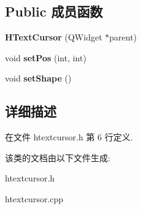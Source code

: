 \subsection*{Public 成员函数}
\begin{DoxyCompactItemize}
\item 
{\bfseries H\+Text\+Cursor} (Q\+Widget $\ast$parent)\label{class_h_text_cursor_a4c210eb0b6ec5f1e2fcbb451e2388579}

\item 
void {\bfseries set\+Pos} (int, int)\label{class_h_text_cursor_a8a496090b53fb685b8dfbf46d0f0e3c6}

\item 
void {\bfseries set\+Shape} ()\label{class_h_text_cursor_a3c48d99d478a81f5bdd43bad2155b948}

\end{DoxyCompactItemize}


\subsection{详细描述}


在文件 htextcursor.\+h 第 6 行定义.



该类的文档由以下文件生成\+:\begin{DoxyCompactItemize}
\item 
htextcursor.\+h\item 
htextcursor.\+cpp\end{DoxyCompactItemize}
